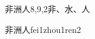 \begin{entry}{非洲人}{8,9,2}{⾮、⽔、⼈}
  \begin{phonetics}{非洲人}{fei1zhou1ren2}
  \end{phonetics}
\end{entry}
